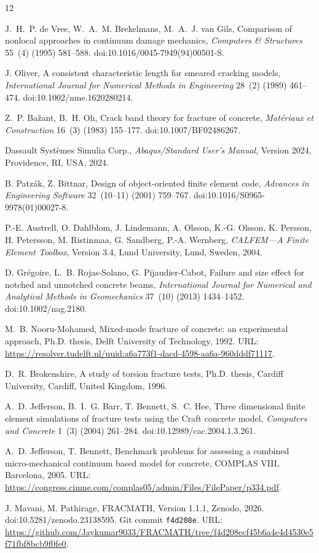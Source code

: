 \documentclass[preprint,11pt,a4paper]{elsarticle}
\begin{document}
\begin{thebibliography}{12}
\small\setlength{\itemsep}{1pt}

J.~H.~P. de Vree, W.~A.~M. Brekelmans, M.~A.~J. van Gils, Comparison of nonlocal approaches in continuum damage mechanics, \emph{Computers \& Structures} 55~(4) (1995) 581--588. doi:10.1016/0045-7949(94)00501-S.

J. Oliver, A consistent characteristic length for smeared cracking models, \emph{International Journal for Numerical Methods in Engineering} 28~(2) (1989) 461--474. doi:10.1002/nme.1620280214.

Z.~P. Ba\v{z}ant, B.~H. Oh, Crack band theory for fracture of concrete, \emph{Mat\'eriaux et Construction} 16~(3) (1983) 155--177. doi:10.1007/BF02486267.

Dassault Syst\`emes Simulia Corp., \emph{Abaqus/Standard User's Manual}, Version 2024, Providence, RI, USA, 2024.

B. Patz\'ak, Z. Bittnar, Design of object-oriented finite element code, \emph{Advances in Engineering Software} 32~(10--11) (2001) 759--767. doi:10.1016/S0965-9978(01)00027-8.

P.-E. Austrell, O. Dahlblom, J. Lindemann, A. Olsson, K.-G. Olsson, K. Persson, H. Petersson, M. Ristinmaa, G. Sandberg, P.-A. Wernberg, \emph{CALFEM---A Finite Element Toolbox}, Version 3.4, Lund University, Lund, Sweden, 2004.

D. Gr\'egoire, L.~B. Rojas-Solano, G. Pijaudier-Cabot, Failure and size effect for notched and unnotched concrete beams, \emph{International Journal for Numerical and Analytical Methods in Geomechanics} 37~(10) (2013) 1434--1452. doi:10.1002/nag.2180.

M.~B. Nooru-Mohamed, Mixed-mode fracture of concrete: an experimental approach, Ph.D. thesis, Delft University of Technology, 1992. URL: \url{https://resolver.tudelft.nl/uuid:a6a773f1-dacd-4598-aa6a-960dddf71117}.

D.~R. Brokenshire, A study of torsion fracture tests, Ph.D. thesis, Cardiff University, Cardiff, United Kingdom, 1996.

A.~D. Jefferson, B.~I.~G. Barr, T. Bennett, S.~C. Hee, Three dimensional finite element simulations of fracture tests using the Craft concrete model, \emph{Computers and Concrete} 1~(3) (2004) 261--284. doi:10.12989/cac.2004.1.3.261.

A.~D. Jefferson, T. Bennett, Benchmark problems for assessing a combined
micro-mechanical continuum based model for concrete, COMPLAS VIII,
Barcelona, 2005. URL: \url{https://congress.cimne.com/complas05/admin/Files/FilePaper/p334.pdf}.

J. Mavani, M. Pathirage, FRACMATH, Version 1.1.1, Zenodo, 2026.
doi:10.5281/zenodo.23138595. Git commit \texttt{f4d208e}. URL:
\url{https://github.com/Jaykumar9033/FRACMATH/tree/f4d208ecf45b6a4e4d4530e5f71fbf8bcb9f0fe0}.

\end{thebibliography}
\end{document}

